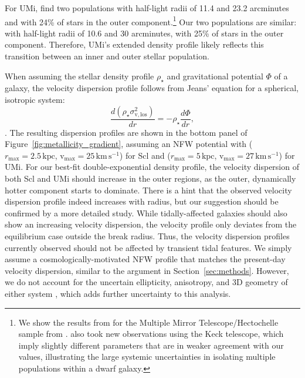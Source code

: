 \documentclass[times,trackchanges, twocolumn, twocolappendix]{aastex701}
\newcommand{\V}{\textrm{v}}
\newcommand{\vmax}{\V_\text{max}}
\newcommand{\rmax}{r_\text{max}}
\newcommand{\kpc}{\text{kpc}}
\newcommand{\kms}{\mathrm{km\,s^{-1}}}
\begin{document}
For UMi, \citet{pace+2020} find two populations with half-light radii of 11.4 and 23.2 arcminutes and with 24\% of stars in the outer component.\footnote{
 We show the results from \citet{pace+2020} for the Multiple Mirror Telescope/Hectochelle sample from \citealt{spencer+2018}. 
 \citet{pace+2020} also took new observations using the Keck telescope, which imply slightly different parameters that are in weaker agreement with our values, illustrating the large systemic uncertainties in isolating multiple populations within a dwarf galaxy.
}
Our two populations are similar: with half-light radii of 10.6 and 30 arcminutes, with 25\% of stars in the outer component. Therefore, UMi's extended density profile likely reflects this transition between an inner and outer stellar population.

When assuming the stellar density profile $\rho_\star$ and gravitational potential $\Phi$ of a galaxy, the velocity dispersion profile follows from  Jeans' equation for a spherical, isotropic system:
\begin{equation}\label{eq:jeans}
    \frac{d(\rho_\star \sigma_{\V,\,\textrm{los}}^2)}{dr} = - \rho_\star \frac{d\Phi}{dr},
\end{equation}
\citep[section 4.2]{BT1987}.
The resulting dispersion profiles are shown in the bottom panel of Figure~\ref{fig:metallicity_gradient}, assuming an NFW potential with
($\rmax=2.5\,\kpc$, $\vmax=25\,\kms$) for Scl and ($\rmax=5\,\kpc$, $\vmax=27\,\kms$) for UMi.
For our best-fit double-exponential density profile, the velocity dispersion of both Scl and UMi should increase in the outer regions, as the outer, dynamically hotter component starts to dominate. There is a hint that the observed velocity dispersion profile indeed increases with radius, but our suggestion should be confirmed by a more detailed study. While tidally-affected galaxies should also show an increasing velocity dispersion, the velocity profile only deviates from the equilibrium case outside the break radius. Thus, the velocity dispersion profiles currently observed should not be affected by transient tidal features. We simply assume a cosmologically-motivated NFW profile that matches the present-day velocity dispersion, similar to the argument in Section~\ref{sec:methods}. However, we do not account for the uncertain ellipticity, anisotropy, and 3D geometry of either system \citep[e.g.,][]{vitral+2024, vitral+2026}, which adds further uncertainty to this analysis.
\end{document}
